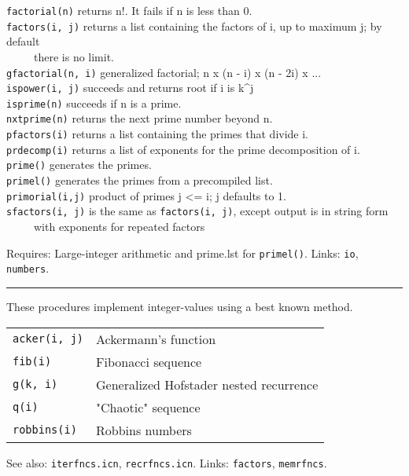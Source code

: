 \texttt{factorial(n)} returns n!. It fails if n is
less than 0.\\
\texttt{factors(i, j)} returns a list containing the factors of i, up to
maximum j; by default\\
 \ \ \ \ \ there is no limit.\\
\texttt{gfactorial(n, i)} generalized factorial; n x (n - i) x (n - 2i)
x ...\\
\texttt{ispower(i, j)} succeeds and returns root if i is k\^{}j\\
\texttt{is}\texttt{prime(n)} succeeds if n is a
prime.\\
\texttt{nxtprime(n)} returns the next prime number beyond n.\\
\texttt{pfactors(i)} returns a list containing the primes that divide
i.\\
\texttt{prdecomp(i)} returns a list of exponents for the prime
decomposition of i.\\
\texttt{prime()} generates the primes.\\
\texttt{primel()} generates the primes from a precompiled list.\\
\texttt{primorial(i,j)} product of primes j {\textless}= i; j defaults
to 1.\\
\texttt{sfactors(i, j)} is the same as \texttt{factors(i, j)}, except
output is in string form\\
 \ \ \ \ \ with exponents for repeated factors

Requires: Large-integer arithmetic and prime.lst for
\texttt{primel()}. Links: \texttt{io}, \texttt{numbers}.

\vspace{0.25cm}\hrule{}

These procedures implement integer-values using a best known method.

\begin{tabular}{m{1in}m{5in}}
\texttt{acker(i, j)} & Ackermann's function\\
\texttt{fib(i)}      & Fibonacci sequence\\
\texttt{g(k, i)}     & Generalized Hofstader nested recurrence\\
\texttt{q(i)}        & "Chaotic" sequence\\
\texttt{robbins(i)}  & Robbins numbers
\end{tabular}
See also: \texttt{iterfncs.icn},
\texttt{recrfncs.icn}. Links: \texttt{factors}, \texttt{memrfncs}. 

